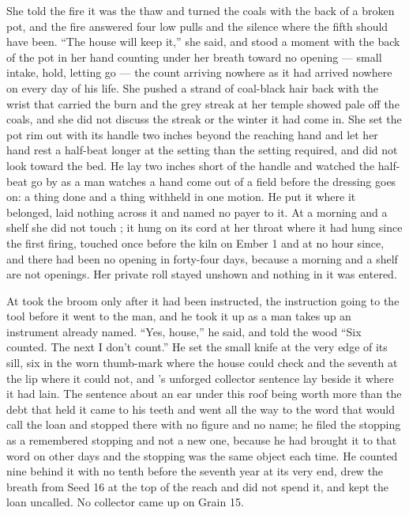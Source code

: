 She told the fire it was the thaw and turned the coals with the back of a broken pot, and the fire answered four low pulls and the silence where the fifth should have been. “The house will keep it,” she said, and stood a moment with the back of the pot in her hand counting under her breath toward no opening --- small intake, hold, letting go --- the count arriving nowhere as it had arrived nowhere on every day of his life. She pushed a strand of coal-black hair back with the wrist that carried the burn and the grey streak at her temple showed pale off the coals, and she did not discuss the streak or the winter it had come in. She set the pot rim out with its handle two inches beyond the reaching hand and let her hand rest a half-beat longer at the setting than the setting required, and did not look toward the bed. He lay two inches short of the handle and watched the half-beat go by as a man watches a hand come out of a field before the dressing goes on: a thing done and a thing withheld in one motion. He put it where it belonged, laid nothing across it and named no payer to it. At a morning and a shelf she did not touch ; it hung on its cord at her throat where it had hung since the first firing, touched once before the kiln on Ember 1 and at no hour since, and there had been no opening in forty-four days, because a morning and a shelf are not openings. Her private roll stayed unshown and nothing in it was entered.

\scenebreak

At   took the broom only after it had been instructed, the instruction going to the tool before it went to the man, and he took it up as a man takes up an instrument already named. “Yes, house,” he said, and told the wood “Six counted. The next I don't count.” He set the small knife at the very edge of its sill, six in the worn thumb-mark where the house could check and the seventh at the lip where it could not, and 's unforged collector sentence lay beside it where it had lain. The sentence about an ear under this roof being worth more than the debt that held it came to his teeth and went all the way to the word that would call the loan and stopped there with no figure and no name; he filed the stopping as a remembered stopping and not a new one, because he had brought it to that word on other days and the stopping was the same object each time. He counted nine behind it with no tenth before the seventh year at its very end, drew the breath from Seed 16 at the top of the reach and did not spend it, and kept the loan uncalled. No collector came up  on Grain 15.

